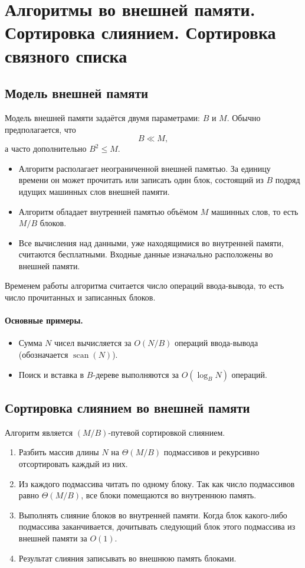 
\section{Алгоритмы во внешней памяти. Сортировка слиянием. Сортировка связного списка}

\subsection{Модель внешней памяти}

Модель внешней памяти задаётся двумя параметрами: $B$ и $M$. Обычно предполагается, что
\[
B \ll M,
\]
а часто дополнительно $B^2 \le M$.

\begin{itemize}
	\item Алгоритм располагает неограниченной внешней памятью. За единицу времени он может прочитать или записать один блок, состоящий из $B$ подряд идущих машинных слов внешней памяти.
	\item Алгоритм обладает внутренней памятью объёмом $M$ машинных слов, то есть $M/B$ блоков.
	\item Все вычисления над данными, уже находящимися во внутренней памяти, считаются бесплатными. Входные данные изначально расположены во внешней памяти.
\end{itemize}

Временем работы алгоритма считается число операций ввода-вывода, то есть число прочитанных и записанных блоков.

\paragraph{Основные примеры.}
\begin{itemize}
	\item Сумма $N$ чисел вычисляется за $O(N/B)$ операций ввода-вывода (обозначается $\operatorname{scan}(N)$).
	\item Поиск и вставка в $B$-дереве выполняются за $O(\log_B N)$ операций.
\end{itemize}

\subsection{Сортировка слиянием во внешней памяти}

Алгоритм является $(M/B)$-путевой сортировкой слиянием.

\begin{enumerate}
	\item Разбить массив длины $N$ на $\Theta(M/B)$ подмассивов и рекурсивно отсортировать каждый из них.
	\item Из каждого подмассива читать по одному блоку. Так как число подмассивов равно $\Theta(M/B)$, все блоки помещаются во внутреннюю память.
	\item Выполнять слияние блоков во внутренней памяти. Когда блок какого-либо подмассива заканчивается, дочитывать следующий блок этого подмассива из внешней памяти за $O(1)$.
	\item Результат слияния записывать во внешнюю память блоками.
\end{enumerate}

